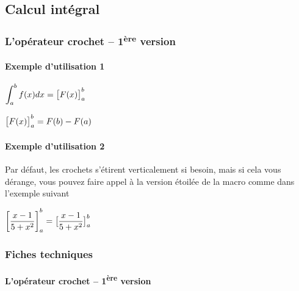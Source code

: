 \documentclass[12pt,a4paper]{article}
\newcommand\dd[1]{d#1}
\begin{document}

\subsection{Calcul intégral}

\subsubsection{L'opérateur crochet -- 1\textsuperscript{ère} version}

\paragraph{Exemple d'utilisation 1}

\begin{latexex}
$\displaystyle
 \int_{a}^{b} f(x) \dd{x}
 = \hook{F(x)}{a}{b}$

$\hook{F(x)}{a}{b}
 = F(b) - F(a)$
\end{latexex}




\paragraph{Exemple d'utilisation 2}

Par défaut, les crochets s'étirent verticalement si besoin, mais si cela vous dérange, vous pouvez faire appel à la version étoilée de la macro comme dans l'exemple suivant

\begin{latexex}
$\displaystyle
 \hook{\frac{x - 1}{5 + x^2}}{a}{b}
 = \hook*{\frac{x - 1}{5 + x^2}}{a}{b}$
\end{latexex}




\subsubsection{Fiches techniques}

\paragraph{L'opérateur crochet -- 1\textsuperscript{ère} version}

\end{document}
